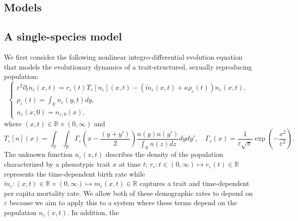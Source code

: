 \documentclass[]{article}
\theoremstyle{remark}
\begin{document}
\subsection{Models}


\subsection*{A single-species model} We first consider the following nonlinear integro-differential evolution equation that models the evolutionary dynamics of a trait-structured, sexually reproducing population:
\begin{equation} \label{eqn:main}
\begin{cases}
\varepsilon^2 \partial_t   n_\varepsilon(x,t)= r_{\varepsilon}(t) T_{\varepsilon}  [ n_\varepsilon](x,t)  
-   \left( \tilde{m}_{\varepsilon}(x,t)  + \kappa \rho_\varepsilon(t) \right) n_\varepsilon(x,t) ,\\
\rho_\varepsilon(t)= \int_{\mathbb R}   n_\varepsilon(y,t)dy,\\
n_\varepsilon(x,0)=n_{\varepsilon,0}(x),
\end{cases}
\end{equation}
where $(x,t)\in{}\mathbb{R}\times(0,\infty)$ and
\begin{equation}
\label{eq: Teps}
T_{\varepsilon}[n](x) =\int_{\mathbb R} \int_{\mathbb R} \Gamma_\varepsilon \left(x-\frac{(y+y')}{2}\right) \frac{n(y)n(y')}{\int_{\mathbb{R}}n(z)dz} dydy',\quad \Gamma_\varepsilon(x)= \frac{1}{\varepsilon\sqrt{\pi}} \exp\left(-\frac{x^2}{\varepsilon^2}\right).
\end{equation}
The unknown function $n_\varepsilon(x,t)$ describes the density of the population characterized by a phenotypic trait $x$ at time $t$; $r_\varepsilon: t\in(0,\infty)\mapsto r_\varepsilon(t)\in\mathbb{R}$ represents the time-dependent birth rate while $\tilde{m}_\varepsilon:(x,t)\in \mathbb{R}\times(0,\infty)\mapsto m_\varepsilon(x,t)\in \mathbb{R}$ captures a trait and time-dependent per capita mortality rate. We allow both of these demographic rates to depend on $\varepsilon$ because we aim to apply this to a system where these terms depend on the population $n_\varepsilon(x,t)$. 
 In addition, the
\end{document}
